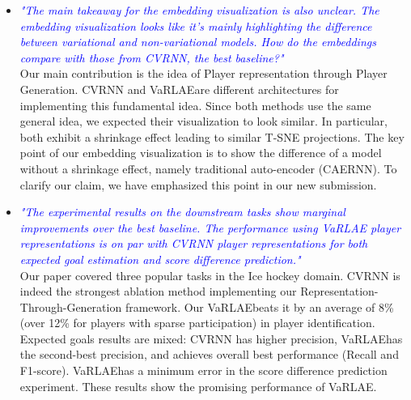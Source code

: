 \documentclass[letterpaper]{article} %
\newcommand{\system}{VaRLAE\;}
\begin{document}
\begin{itemize}
    \item \textcolor{Blue}{\it "The main takeaway for the embedding visualization is also unclear. The embedding visualization looks like it’s mainly highlighting the difference between variational and non-variational models. How do the embeddings compare with those from CVRNN, the best baseline?"}\\
    Our main contribution is the idea of Player representation through Player Generation. CVRNN and \system are different architectures for implementing this fundamental idea. Since both methods use the same general idea, we expected their visualization to look similar. In particular, both exhibit a shrinkage effect leading to similar T-SNE projections. 
    The key point of our embedding visualization is to show the difference of a model without a shrinkage effect, namely traditional auto-encoder (CAERNN). To clarify our claim, we have emphasized this point in our new submission.
    \item\textcolor{Blue}{\it "The experimental results on the downstream tasks show marginal improvements over the best baseline. The performance using VaRLAE player representations is on par with CVRNN player representations for both expected goal estimation and score difference prediction."}\\
    Our paper covered three popular tasks in the Ice hockey domain.
    CVRNN is indeed the strongest 
    ablation method implementing our Representation-Through-Generation framework. Our \system  beats it by an average of 8\% (over 12\% for players with sparse participation) in player identification. Expected goals results are mixed: CVRNN has higher precision, \system has the second-best precision, and achieves overall best performance (Recall and F1-score). \system has a minimum error in the score difference prediction experiment. These results show the promising performance of \system.
    
\end{itemize}
\end{document}
